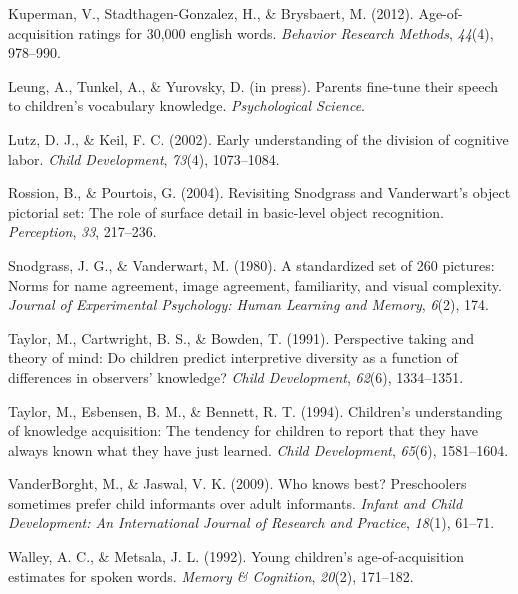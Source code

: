 \documentclass[10pt, letterpaper]{article}
\begin{document}
\leavevmode\hypertarget{ref-kuperman2012}{}%
Kuperman, V., Stadthagen-Gonzalez, H., \& Brysbaert, M. (2012).
Age-of-acquisition ratings for 30,000 english words. \emph{Behavior
Research Methods}, \emph{44}(4), 978--990.

\leavevmode\hypertarget{ref-leung2021}{}%
Leung, A., Tunkel, A., \& Yurovsky, D. (in press). Parents fine-tune
their speech to children's vocabulary knowledge. \emph{Psychological
Science}.

\leavevmode\hypertarget{ref-lutz2002}{}%
Lutz, D. J., \& Keil, F. C. (2002). Early understanding of the division
of cognitive labor. \emph{Child Development}, \emph{73}(4), 1073--1084.

\leavevmode\hypertarget{ref-rossion2004}{}%
Rossion, B., \& Pourtois, G. (2004). Revisiting Snodgrass and
Vanderwart's object pictorial set: The role of surface detail in
basic-level object recognition. \emph{Perception}, \emph{33}, 217--236.

\leavevmode\hypertarget{ref-snodgrass1980}{}%
Snodgrass, J. G., \& Vanderwart, M. (1980). A standardized set of 260
pictures: Norms for name agreement, image agreement, familiarity, and
visual complexity. \emph{Journal of Experimental Psychology: Human
Learning and Memory}, \emph{6}(2), 174.

\leavevmode\hypertarget{ref-taylor1991}{}%
Taylor, M., Cartwright, B. S., \& Bowden, T. (1991). Perspective taking
and theory of mind: Do children predict interpretive diversity as a
function of differences in observers' knowledge? \emph{Child
Development}, \emph{62}(6), 1334--1351.

\leavevmode\hypertarget{ref-taylor1994}{}%
Taylor, M., Esbensen, B. M., \& Bennett, R. T. (1994). Children's
understanding of knowledge acquisition: The tendency for children to
report that they have always known what they have just learned.
\emph{Child Development}, \emph{65}(6), 1581--1604.

\leavevmode\hypertarget{ref-vanderborght2009}{}%
VanderBorght, M., \& Jaswal, V. K. (2009). Who knows best? Preschoolers
sometimes prefer child informants over adult informants. \emph{Infant
and Child Development: An International Journal of Research and
Practice}, \emph{18}(1), 61--71.

\leavevmode\hypertarget{ref-walley1992}{}%
Walley, A. C., \& Metsala, J. L. (1992). Young children's
age-of-acquisition estimates for spoken words. \emph{Memory \&
Cognition}, \emph{20}(2), 171--182.


\end{document}
